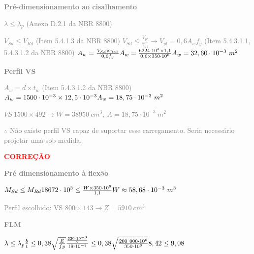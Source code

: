 \begin{enumerate}
    \textcolor{gray}{\textbf{Pré-dimensionamento ao cisalhamento}}

    \textcolor{gray}{$\lambda \leq \lambda_p$ (Anexo D.2.1 da NBR 8800)} 

    \textcolor{gray}{$V_{Sd} \leq V_{Rd}$ (Item 5.4.1.3 da NBR 8800) \newline $V_{Sd} \leq \frac{V_{pl}}{\gamma_{a1}} \to V_{pl} = 0,6 A_w f_y$ (Item 5.4.3.1.1, 5.4.3.1.2 da NBR 8800) \newline $A_w = \frac{V_{Sd} \times \gamma_{a1}}{0,6 f_y} \newline A_w = \frac{6224 \cdot 10^3 \times 1,1}{0,6 \times 350 \cdot 10^6} \newline A_w = 32,60 \cdot 10^{-3} \ m^2$}

    \textcolor{gray}{\textbf{Perfil VS}}

    \textcolor{gray}{$A_w = d \times t_w$ (Item 5.4.3.1.2 da NBR 8800) \newline $A_w = 1500 \cdot 10^{-3} \times 12,5 \cdot 10^{-3} \newline A_w = 18,75 \cdot 10^{-3} \ m^2$}

    \textcolor{gray}{$VS \ 1500 \times 492 \to W = 38950 \ cm^3, \ A = 18,75 \cdot 10^{-3} \ m^2$}

    \textcolor{gray}{$\therefore$ Não existe perfil VS capaz de suportar esse carregamento. Seria necessário projetar uma sob medida.}

    
    
    
    \newpage

    \textcolor{red}{\textbf{\MakeUppercase{Correção}}}

    \textcolor{gray}{\textbf{Pré dimensionamento à flexão}}

    \textcolor{gray}{$M_{Sd} \leq M_{Rd} \newline 18672 \cdot 10^3 \leq \frac{W \times 350 \cdot 10^6}{1,1} \newline W \approx 58,68 \cdot 10^{-3} \ m^3$}

    \textcolor{gray}{Perfil escolhido: VS $800 \times 143 \to Z = 5910 \ cm^3$}

    \textcolor{gray}{\textbf{FLM}}

    \textcolor{gray}{$\lambda \leq \lambda_p \newline \frac{b}{t} \leq 0,38 \sqrt{\frac{E}{fy}} \newline \frac{\frac{320 \cdot 10^{-3}}{2}}{19 \cdot 10^{-3}} \leq 0,38 \sqrt{\frac{200 \ 000 \cdot 10^6}{350 \cdot 10^6}} \newline 8,42 \leq 9,08$}


\end{enumerate}
